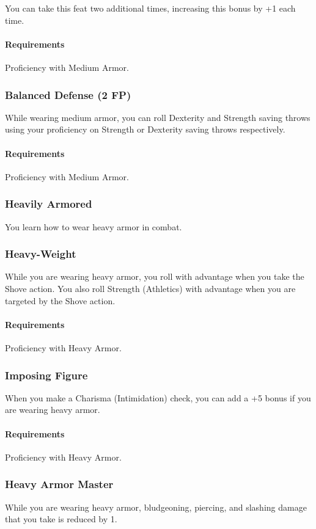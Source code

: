     You can take this feat two additional times, increasing this bonus by +1 each time.
    \paragraph{Requirements} Proficiency with Medium Armor.
\subsubsection{Balanced Defense (2 FP)} \label{feat::balanceddefense}
    While wearing medium armor, you can roll Dexterity and Strength saving throws using your proficiency on Strength or Dexterity saving throws respectively.
    \paragraph{Requirements} Proficiency with Medium Armor.
\subsubsection{Heavily Armored} \label{feat::heavilyarmored}
    You learn how to wear heavy armor in combat.
\subsubsection{Heavy-Weight} \label{feat::heavyweight}
    While you are wearing heavy armor, you roll with advantage when you take the Shove action.
    You also roll Strength (Athletics) with advantage when you are targeted by the Shove action.
    \paragraph{Requirements} Proficiency with Heavy Armor.
\subsubsection{Imposing Figure} \label{feat::imposingfigure}
    When you make a Charisma (Intimidation) check, you can add a +5 bonus if you are wearing heavy armor.
    \paragraph{Requirements} Proficiency with Heavy Armor.
\subsubsection{Heavy Armor Master} \label{feat::heavyarmormaster}
    While you are wearing heavy armor, bludgeoning, piercing, and slashing damage that you take is reduced by 1.

